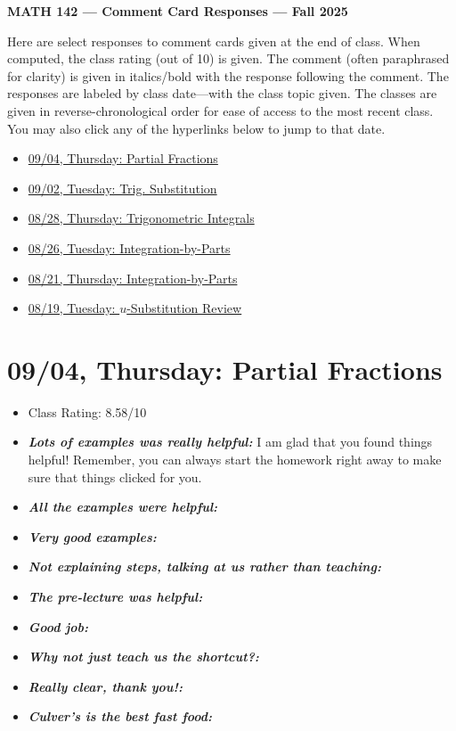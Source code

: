 \documentclass[11pt,letterpaper]{article}
\begin{document}
\begin{center} {\bfseries \LARGE MATH 142 --- Comment Card Responses --- Fall 2025} \end{center}

Here are select responses to comment cards given at the end of class. When computed, the class rating (out of 10) is given. The comment (often paraphrased for clarity) is given in italics/bold with the response following the comment. The responses are labeled by class date---with the class topic given. The classes are given in reverse-chronological order for ease of access to the most recent class. You may also click any of the hyperlinks below to jump to that date.

\begin{itemize}
\item \hyperref[09-04]{09/04, Thursday: Partial Fractions}
\item \hyperref[09-02]{09/02, Tuesday: Trig. Substitution}
\item \hyperref[08-28]{08/28, Thursday: Trigonometric Integrals}
\item \hyperref[08-26]{08/26, Tuesday: Integration-by-Parts}
\item \hyperref[08-21]{08/21, Thursday: Integration-by-Parts}
\item \hyperref[08-19]{08/19, Tuesday: $u$-Substitution Review}
\end{itemize}

\newpage
\section*{09/04, Thursday: Partial Fractions\label{09-04}}

\begin{itemize}
\item Class Rating: 8.58/10
\item {\bfseries\itshape Lots of examples was really helpful:} I am glad that you found things helpful! Remember, you can always start the homework right away to make sure that things clicked for you. 

\item {\bfseries\itshape All the examples were helpful:}
\item {\bfseries\itshape Very good examples:}
\item {\bfseries\itshape Not explaining steps, talking at us rather than teaching:}
\item {\bfseries\itshape The pre-lecture was helpful:} 
\item {\bfseries\itshape Good job:}
\item {\bfseries\itshape Why not just teach us the shortcut?:} 
\item {\bfseries\itshape Really clear, thank you!:}


\item {\bfseries\itshape Culver's is the best fast food:}
\end{itemize}
\end{document}
